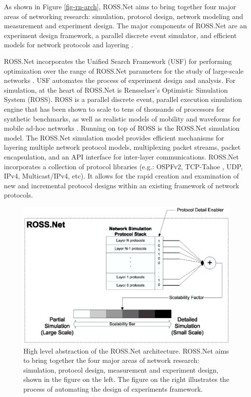 \documentclass[conference,onecolumn]{IEEEtran}
\begin{document}
As shown in Figure \ref{fig-rn-arch}, ROSS.Net aims to bring together four major areas of networking research: simulation, protocol design, network modeling and measurement and experiment design.  The major components of ROSS.Net are an experiment design framework, a parallel discrete event simulator, and efficient models for network protocols and layering \cite{yaun-2003-1,bauer-2003, bauer-2004}.

ROSS.Net incorporates the Unified Search Framework (USF) for performing optimization over the range of ROSS.Net parameters for the study of large-scale networks \cite{ye-2003}.  USF automates the process of experiment design and analysis.  For simulation, at the heart of ROSS.Net is Rensselaer's Optimistic Simulation System (ROSS). ROSS is a parallel discrete event, parallel execution simulation engine that has been shown to scale to tens of thousands of processors for synthetic benchmarks, as well as realistic models of mobility and waveforms for mobile ad-hoc networks \cite{bauer-2002}. Running on top of ROSS is the ROSS.Net simulation model. The ROSS.Net simulation model provides efficient mechanisms for layering multiple network protocol models, multiplexing packet streams, packet encapsulation, and an API interface for inter-layer communications. ROSS.Net incorporates a collection of protocol libraries (e.g.: OSPFv2, TCP-Tahoe \cite{yaun-2003-2}, UDP, IPv4, Multicast/IPv4, etc). It allows for the rapid creation and examination of new and incremental protocol designs within an existing framework of network protocols.

\begin{figure}[!h]
\centering
\hspace{-0.5in}
\includegraphics[width=5in]{rn_architecture.ps}
\caption{High level abstraction of the ROSS.Net architecture.  ROSS.Net aims to bring together the four major areas of network research: simulation, protocol design, measurement and experiment design, shown in the figure on the left.  The figure on the right illustrates the process of automating the design of experiments framework.}
\label{fig-rn-arch2}
\end{figure}
\end{document}
